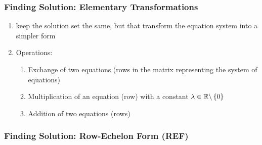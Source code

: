 \subsubsection{Finding Solution: Elementary Transformations}

\begin{enumerate}
    \item keep the solution set the same, but that transform the equation system into a simpler form
    \hfill \cite{mfml/book/mml/Deisenroth-Faisal-Ong}

    \item Operations:
    \begin{enumerate}
        \item Exchange of two equations (rows in the matrix representing the system of equations)
        \hfill \cite{mfml/book/mml/Deisenroth-Faisal-Ong}

        \item Multiplication of an equation (row) with a constant $\lambda \in \mathbb{R} \backslash \left\{0\right\}$
        \hfill \cite{mfml/book/mml/Deisenroth-Faisal-Ong}

        \item Addition of two equations (rows) 
        \hfill \cite{mfml/book/mml/Deisenroth-Faisal-Ong}
    \end{enumerate}
\end{enumerate}










\subsubsection{Finding Solution: Row-Echelon Form (REF)}

